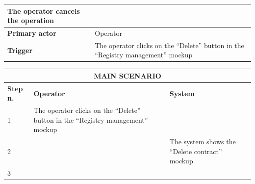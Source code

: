 {{{\begin{table}[h]
\begin{tabular}{|p{4cm}|p{10cm}|}
				The operator cancels the operation\vspace{1mm}\\
			\hline
				\centering \vspace{1mm} \bfseries{Primary actor} \vspace{1mm} & 
				\vspace{1mm} Operator \vspace{1mm}\\
			\hline
				\centering \vspace{1mm} \bfseries{Trigger} \vspace{1mm} & 
				\vspace{1mm} The operator clicks on the “Delete” button in the “Registry management” mockup\vspace{1mm}\\
			\hline
			\end{tabular}
			\end{table}
			\begin{table}[h]
			\begin{tabular}{|p{2cm}|p{6cm}|p{6cm}|}
			\hline
				\multicolumn{3}{|c|}{MAIN SCENARIO} \\
			\hline
				\vspace{1mm} \bfseries{Step n.} \vspace{1mm} &
				\vspace{1mm} \bfseries{Operator} \vspace{1mm} & 
				\vspace{1mm} \bfseries{System} \vspace{1mm}\\
			\hline
				\vspace{1mm} 1 \vspace{1mm} &
				\vspace{1mm} The operator clicks on the “Delete”  button  in the “Registry management”  mockup \vspace{1mm} & 
				\vspace{1mm} \vspace{1mm} \\
			\hline
				\vspace{1mm} 2 \vspace{1mm} &
				\vspace{1mm} \vspace{1mm} & 
				\vspace{1mm} The system shows the “Delete contract”  mockup \vspace{1mm} \\
			\hline
				\vspace{1mm} 3 \vspace{1mm} &

\end{tabular}
\end{table}}}}

